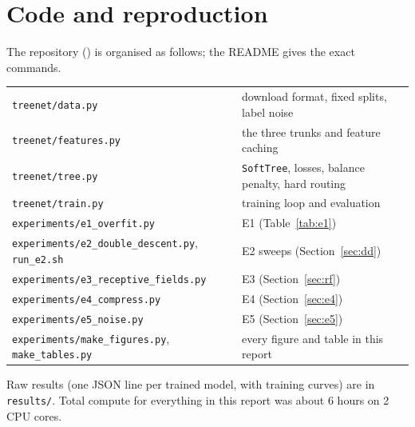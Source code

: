 \section{Code and reproduction}
The repository (\repo) is organised as follows; the README gives the exact commands.
\begin{center}\small
\begin{tabular}{ll}
\toprule
\texttt{treenet/data.py} & download format, fixed splits, label noise \\
\texttt{treenet/features.py} & the three trunks and feature caching \\
\texttt{treenet/tree.py} & \texttt{SoftTree}, losses, balance penalty, hard routing \\
\texttt{treenet/train.py} & training loop and evaluation \\
\texttt{experiments/e1\_overfit.py} & E1 (Table~\ref{tab:e1}) \\
\texttt{experiments/e2\_double\_descent.py}, \texttt{run\_e2.sh} & E2 sweeps (Section~\ref{sec:dd}) \\
\texttt{experiments/e3\_receptive\_fields.py} & E3 (Section~\ref{sec:rf}) \\
\texttt{experiments/e4\_compress.py} & E4 (Section~\ref{sec:e4}) \\
\texttt{experiments/e5\_noise.py} & E5 (Section~\ref{sec:e5}) \\
\texttt{experiments/make\_figures.py}, \texttt{make\_tables.py} & every figure and table in this report \\
\bottomrule
\end{tabular}
\end{center}
Raw results (one JSON line per trained model, with training curves) are in \texttt{results/}. Total compute for everything in this report was about 6 hours on 2 CPU cores.
